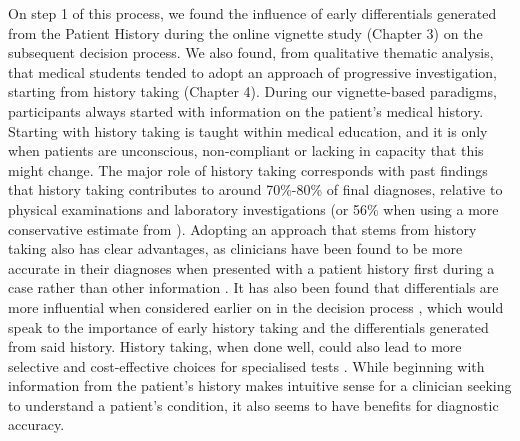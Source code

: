 \documentclass[a4paper, nobind]{templates/ociamthesis}
\begin{document}
On step 1 of this process, we found the influence of early differentials generated from the Patient History during the online vignette study (Chapter 3) on the subsequent decision process. We also found, from qualitative thematic analysis, that medical students tended to adopt an approach of progressive investigation, starting from history taking (Chapter 4). During our vignette-based paradigms, participants always started with information on the patient's medical history. Starting with history taking is taught within medical education, and it is only when patients are unconscious, non-compliant or lacking in capacity that this might change. The major role of history taking corresponds with past findings that history taking contributes to around 70\%-80\% of final diagnoses, relative to physical examinations and laboratory investigations \autocite{hampton_relative_1975,peterson_contributions_1992,tsukamoto_contribution_2012} (or 56\% when using a more conservative estimate from \textcite{sandler_importance_1980}). Adopting an approach that stems from history taking also has clear advantages, as clinicians have been found to be more accurate in their diagnoses when presented with a patient history first during a case rather than other information \autocite{tio_effect_2022}. It has also been found that differentials are more influential when considered earlier on in the decision process \autocite{kourtidis_influences_2022}, which would speak to the importance of early history taking and the differentials generated from said history. History taking, when done well, could also lead to more selective and cost-effective choices for specialised tests \autocite{muhrer_importance_2014}. While beginning with information from the patient's history makes intuitive sense for a clinician seeking to understand a patient's condition, it also seems to have benefits for diagnostic accuracy.
\end{document}
